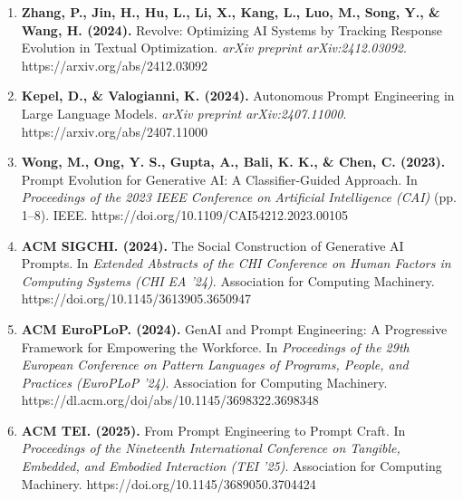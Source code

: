 \documentclass[10pt,a4paper,twocolumn]{article}
\begin{document}
\begin{enumerate}
   \item 
\textbf{Zhang, P., Jin, H., Hu, L., Li, X., Kang, L., Luo, M., Song, Y., \& Wang, H. (2024).} Revolve: Optimizing AI Systems by Tracking Response Evolution in Textual Optimization.  \textit{arXiv preprint arXiv:2412.03092}.  https://arxiv.org/abs/2412.03092

  \item 
\textbf{Kepel, D., \& Valogianni, K. (2024).} Autonomous Prompt Engineering in Large Language Models.  \textit{arXiv preprint arXiv:2407.11000}.  https://arxiv.org/abs/2407.11000

   \item 
\textbf{Wong, M., Ong, Y. S., Gupta, A., Bali, K. K., \& Chen, C. (2023).} Prompt Evolution for Generative AI: A Classifier-Guided Approach. In \textit{Proceedings of the 2023 IEEE Conference on Artificial Intelligence (CAI)} (pp. 1–8). IEEE.  https://doi.org/10.1109/CAI54212.2023.00105

   \item 
\textbf{ACM SIGCHI. (2024).} The Social Construction of Generative AI Prompts. In \textit{Extended Abstracts of the CHI Conference on Human Factors in Computing Systems (CHI EA '24)}. Association for Computing Machinery. https://doi.org/10.1145/3613905.3650947

  \item 
\textbf{ACM EuroPLoP. (2024).} GenAI and Prompt Engineering: A Progressive Framework for Empowering the Workforce. In \textit{Proceedings of the 29th European Conference on Pattern Languages of Programs, People, and Practices (EuroPLoP '24)}. Association for Computing Machinery. https://dl.acm.org/doi/abs/10.1145/3698322.3698348

  \item 
\textbf{ACM TEI. (2025).} From Prompt Engineering to Prompt Craft. In \textit{Proceedings of the Nineteenth International Conference on Tangible, Embedded, and Embodied Interaction (TEI '25)}. Association for Computing Machinery.  https://doi.org/10.1145/3689050.3704424



 

\end{enumerate}


\newpage
\end{document}
